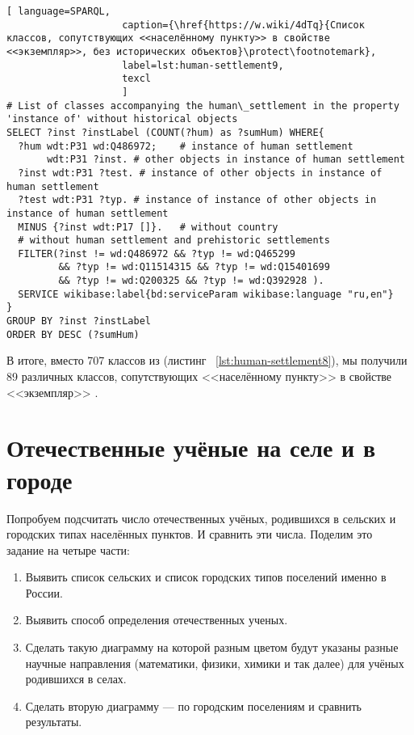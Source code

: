 \lstset{numbers=left, firstnumber=1, frame=single}
\begin{lstlisting}[ language=SPARQL, 
                    caption={\href{https://w.wiki/4dTq}{Cписок классов, сопутствующих <<населённому пункту>> в свойстве <<экземпляр>>, без исторических объектов}\protect\footnotemark},
                    label=lst:human-settlement9,
                    texcl 
                    ]
# List of classes accompanying the human\_settlement in the property 'instance of' without historical objects 
SELECT ?inst ?instLabel (COUNT(?hum) as ?sumHum) WHERE{
  ?hum wdt:P31 wd:Q486972;    # instance of human settlement
       wdt:P31 ?inst. # other objects in instance of human settlement
  ?inst wdt:P31 ?test. # instance of other objects in instance of human settlement
  ?test wdt:P31 ?typ. # instance of instance of other objects in instance of human settlement
  MINUS {?inst wdt:P17 []}.   # without country
  # without human settlement and prehistoric settlements
  FILTER(?inst != wd:Q486972 && ?typ != wd:Q465299 
         && ?typ != wd:Q11514315 && ?typ != wd:Q15401699 
         && ?typ != wd:Q200325 && ?typ != wd:Q392928 ). 
  SERVICE wikibase:label{bd:serviceParam wikibase:language "ru,en"}
}
GROUP BY ?inst ?instLabel
ORDER BY DESC (?sumHum)
\end{lstlisting}%

В итоге, вместо 707 классов из (листинг ~\protect\ref{lst:human-settlement8}), мы получили 89 различных классов, сопутствующих <<населённому пункту>> в свойстве <<экземпляр>> . 

\section{Отечественные учёные на селе и в городе}

Попробуем подсчитать число отечественных учёных, родившихся в сельских и городских типах населённых пунктов. И сравнить эти числа.
Поделим это задание на четыре части:
\begin{enumerate}
  \item Выявить список сельских и список городских типов поселений именно в России.
  \item Выявить способ определения отечественных ученых.
  \item Сделать такую диаграмму на которой разным цветом будут указаны разные научные направления (математики, физики, химики и так далее) для учёных родившихся в селах.
  \item Сделать вторую диаграмму — по городским поселениям и сравнить результаты.
\end{enumerate}

